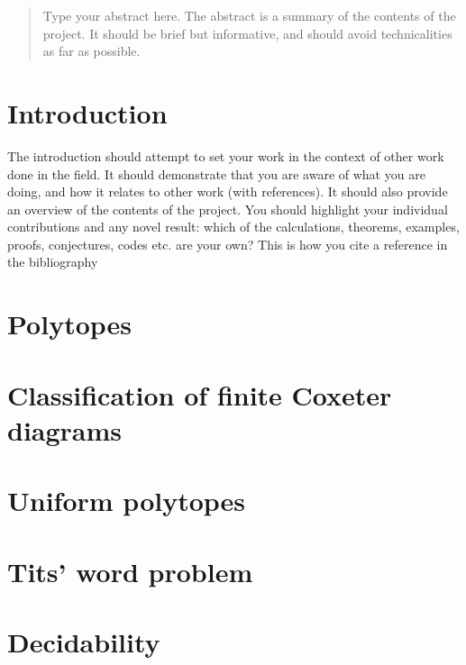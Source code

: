 \documentclass[a4paper,11pt, titlepage]{article}
\begin{document}
\begin{titlepage}

\end{titlepage}

\begin{abstract}
Type your abstract here. The abstract is a summary of the contents of the project. It should be brief but informative, and
should avoid technicalities as far as possible.
\end{abstract}

\tableofcontents
\clearpage

\section{Introduction}
The introduction should attempt to set your work in the context of other work done in the field. It
should demonstrate that you are aware of what you are doing, and how it relates to other work
(with references). It should also provide an overview of the contents of the project. You should
highlight your individual contributions and any novel result: which of the calculations, theorems,
examples, proofs, conjectures, codes etc. are your own? This is how you cite a reference in the bibliography\cite{Riemann2024}

\section{Polytopes}


\section{Classification of finite Coxeter diagrams}


\section{Uniform polytopes}


\section{Tits' word problem}


\section{Decidability}



\end{document}
